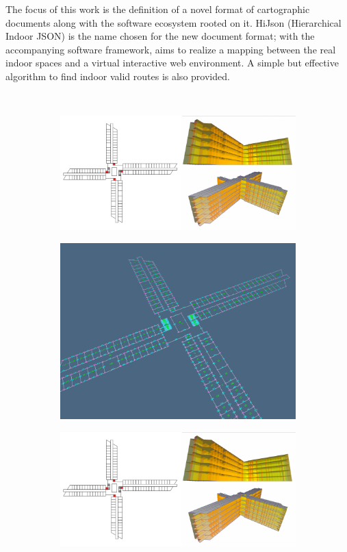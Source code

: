 \documentclass{sig-alternate}
\begin{document}
The focus of this work is the definition of a novel format of cartographic documents along with the software ecosystem rooted on it. HiJson (Hierarchical Indoor JSON) is the name chosen for the new document format; with the accompanying software framework, aims to realize a mapping between the real indoor spaces and a virtual interactive web environment. A simple but effective algorithm to find indoor valid routes is also provided. 


\begin{figure}[tbh]
 \centering
 ~
 \begin{subfigure}[b]{0.22\linewidth}
 \includegraphics[width=\textwidth]{../images/sogei-a} 
 \end{subfigure}
\hfill
 \begin{subfigure}[b]{0.27\linewidth}
 \includegraphics[width=\textwidth]{../images/building} 
 \end{subfigure}
\hfill
 \begin{subfigure}[b]{0.22\linewidth}
 \includegraphics[width=\textwidth]{../images/sogei-b}

\end{subfigure}
\end{figure}
\end{document}
